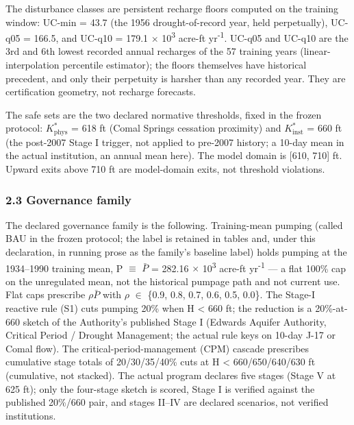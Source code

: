 \documentclass[11pt]{article}
\begin{document}
The disturbance classes are persistent recharge floors computed on the
training window: UC-min = 43.7 (the 1956 drought-of-record year, held
perpetually), UC-q05 = 166.5, and UC-q10 = 179.1 \ensuremath{\times} 10\textsuperscript{3} acre-ft yr\textsuperscript{-1}.
UC-q05 and UC-q10 are the 3rd and 6th lowest recorded annual recharges
of the 57 training years (linear-interpolation percentile estimator);
the floors themselves have historical precedent, and only their
perpetuity is harsher than any recorded year. They are certification
geometry, not recharge forecasts.

The safe sets are the two declared normative thresholds, fixed in the
frozen protocol: \(K^{\ast}_{\mathrm{phys}}\) = 618 ft (Comal Springs
cessation proximity) and \(K^{\ast}_{\mathrm{inst}}\) = 660 ft (the
post-2007 Stage I trigger, not applied to pre-2007 history; a 10-day
mean in the actual institution, an annual mean here). The model domain
is {[}610, 710{]} ft. Upward exits above 710 ft are model-domain exits,
not threshold violations.

\subsubsection{2.3 Governance family}\label{edw-governance-family}

The declared governance family is the following. Training-mean pumping
(called BAU in the frozen protocol; the label is retained in tables and,
under this declaration, in running prose as the family's baseline label)
holds pumping at the 1934--1990 training mean, P \ensuremath{\equiv} \(\bar{P}\) = 282.16 \ensuremath{\times} 10\textsuperscript{3}
acre-ft yr\textsuperscript{-1} --- a flat 100\% cap on the unregulated mean, not the
historical pumpage path and not current use. Flat caps prescribe \ensuremath{\rho}\(\bar{P}\) with
\ensuremath{\rho} \ensuremath{\in} \{0.9, 0.8, 0.7, 0.6, 0.5, 0.0\}. The Stage-I reactive rule (S1)
cuts pumping 20\% when H \textless{} 660 ft; the reduction is a
20\%-at-660 sketch of the Authority's published Stage I (Edwards Aquifer
Authority, Critical Period / Drought Management; the actual rule keys on
10-day J-17 or Comal flow). The critical-period-management (CPM) cascade
prescribes cumulative stage totals of 20/30/35/40\% cuts at H
\textless{} 660/650/640/630 ft (cumulative, not stacked). The actual
program declares five stages (Stage V at 625 ft); only the four-stage
sketch is scored, Stage I is verified against the published 20\%/660
pair, and stages II--IV are declared scenarios, not verified
institutions.
\end{document}
